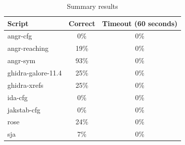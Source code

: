 \begin{table}[h]
    \centering
    \caption{Summary results}
    \begin{tabular}{@{}lcc@{}}
        \toprule
        Script & Correct & Timeout (60 seconds) \\ \midrule
        angr-cfg & 0\% & 0\% \\
        angr-reaching & 19\% & 0\% \\
        angr-sym & 93\% & 0\% \\
        ghidra-galore-11.4 & 25\% & 0\% \\
        ghidra-xrefs & 25\% & 0\% \\
        ida-cfg & 0\% & 0\% \\
        jakstab-cfg & 0\% & 0\% \\
        rose & 24\% & 0\% \\
        sja & 7\% & 0\% \\
        \bottomrule
    \end{tabular}
    \label{tab:summary}
\end{table}